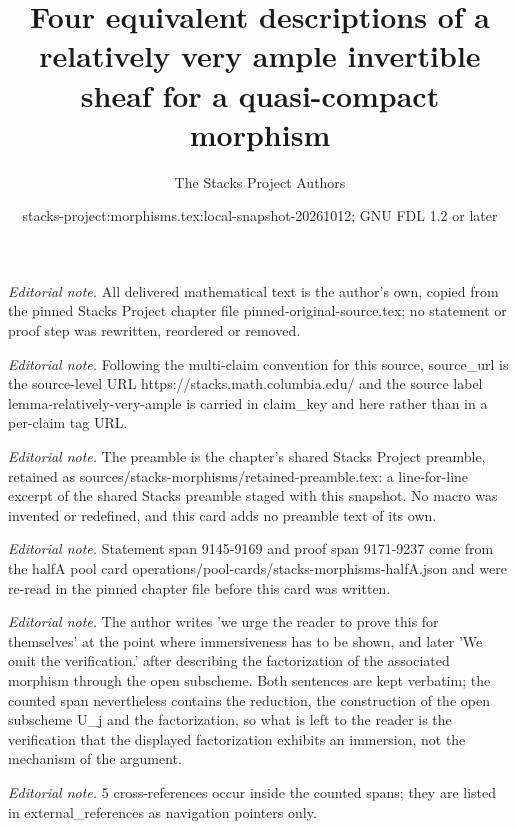 \documentclass[10pt,a4paper]{amsart}
\title{Four equivalent descriptions of a relatively very ample invertible sheaf for a quasi-compact morphism}
\author{The Stacks Project Authors}
\date{stacks-project:morphisms.tex:local-snapshot-20261012; GNU FDL 1.2 or later}
\theoremstyle{plain}
\theoremstyle{definition}
\theoremstyle{remark}
\numberwithin{equation}{subsection}
\begin{document}
\maketitle
\noindent\textit{Editorial note.} All delivered mathematical text is the author's own, copied from the pinned Stacks Project chapter file pinned-original-source.tex; no statement or proof step was rewritten, reordered or removed.\par\medskip
\noindent\textit{Editorial note.} Following the multi-claim convention for this source, source\_url is the source-level URL https://stacks.math.columbia.edu/ and the source label lemma-relatively-very-ample is carried in claim\_key and here rather than in a per-claim tag URL.\par\medskip
\noindent\textit{Editorial note.} The preamble is the chapter's shared Stacks Project preamble, retained as sources/stacks-morphisms/retained-preamble.tex: a line-for-line excerpt of the shared Stacks preamble staged with this snapshot. No macro was invented or redefined, and this card adds no preamble text of its own.\par\medskip
\noindent\textit{Editorial note.} Statement span 9145-9169 and proof span 9171-9237 come from the halfA pool card operations/pool-cards/stacks-morphisms-halfA.json and were re-read in the pinned chapter file before this card was written.\par\medskip
\noindent\textit{Editorial note.} The author writes 'we urge the reader to prove this for themselves' at the point where immersiveness has to be shown, and later 'We omit the verification.' after describing the factorization of the associated morphism through the open subscheme. Both sentences are kept verbatim; the counted span nevertheless contains the reduction, the construction of the open subscheme U\_j and the factorization, so what is left to the reader is the verification that the displayed factorization exhibits an immersion, not the mechanism of the argument.\par\medskip
\noindent\textit{Editorial note.} 5 cross-references occur inside the counted spans; they are listed in external\_references as navigation pointers only.\par\medskip
\end{document}
